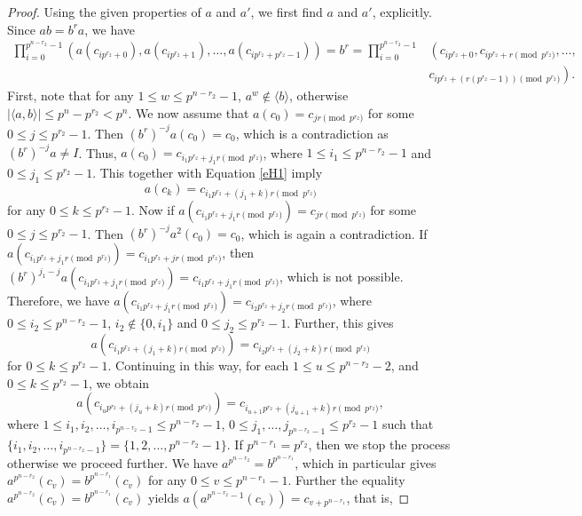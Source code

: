 \documentclass[11pt]{amsart}
\theoremstyle{plain}
\numberwithin{equation}{section}
\begin{document}
 \begin{proof}
 Using the given properties of $a$ and $a'$, we first find $a$ and $a'$, explicitly. Since $ab=b^{r}a$, we have 
 \begin{equation}\label{eH1}
 \begin{split}
 \displaystyle  \prod_{i=0}^{p^{n-r_2}-1}\left(a(c_{ip^{r_2}+0}),a(c_{ip^{r_2}+1}),\ldots,a(c_{ip^{r_2}+p^{r_2}-1})\right)=b^r=\displaystyle  \prod_{i=0}^{p^{n-r_2}-1}&\left(c_{ip^{r_2}+0},c_{ip^{r_2}+r\pmod{p^{r_2}}},\ldots,\right.\\&\left. c_{ip^{r_2}+(r(p^{r_2}-1))\pmod{p^{r_2}}}\right).
 \end{split}
 \end{equation}
 First, note that for any $1 \le w \le p^{n-r_2}-1$, $a^w \not \in \langle b \rangle$, otherwise $|\langle a,b \rangle| \leq p^n-p^{r_2}  <p^n$.  We now assume that $a(c_0)=c_{jr \pmod{p^{r_2}}}$ for some $0 \le j \le p^{r_2}-1$. Then $(b^r)^{-j}a(c_0)=c_0$, which is a contradiction as $(b^r)^{-j}a \neq I$. Thus, $a(c_0)=c_{i_1p^{r_2}+j_1r \pmod{p^{r_2}}}$, where $1 \le i_1 \le p^{n-r_2}-1$ and $0 \le j_1 \le p^{r_2}-1$. This together with Equation \eqref{eH1} imply 
 \begin{equation}\label{eH2}
 a(c_k)=c_{i_1p^{r_2}+(j_1+k)r\pmod{p^{r_2}}}
 \end{equation}
  for any $0 \leq k \leq p^{r_2}-1$. Now if $a(c_{i_1p^{r_2}+j_1r \pmod{p^{r_2}}})=c_{jr \pmod{p^{r_2}}}$ for some $0 \le j \le p^{r_2}-1$. Then $(b^r)^{-j}a^2(c_0)=c_0$, which is again a contradiction. If  $a(c_{i_1p^{r_2}+j_1r \pmod{p^{r_2}}})=c_{i_1p^{r_2}+jr \pmod{p^{r_2}}}$, then $(b^r)^{j_1-j}a(c_{i_1p^{r_2}+j_1r \pmod{p^{r_2}}})=c_{i_1p^{r_2}+j_1r \pmod{p^{r_2}}}$, which is not possible. Therefore, we have $a(c_{i_1p^{r_2}+j_1r \pmod{p^{r_2}}})=c_{i_2p^{r_2}+j_2r \pmod{p^{r_2}}}$, where $0 \le i_2 \le p^{n-r_2}-1$, $i_2 \not \in \{0,i_1\}$ and $0 \le j_2 \le p^{r_2}-1$. Further, this gives $$a\left(c_{i_1p^{r_2}+(j_1+k)r \pmod{p^{r_2}}}\right)=c_{i_2p^{r_2}+(j_2+k)r \pmod{p^{r_2}}}$$ for $ 0 \le k \le p^{r_2}-1$. Continuing in this way, for each $1 \le u \le p^{n-r_2}-2$, and $0 \le k \le p^{r_2}-1$, we obtain 
 \begin{equation}\label{eH3}
 a\left(c_{i_up^{r_2}+(j_u+k)r \pmod{p^{r_2}}}\right)=c_{i_{u+1}p^{r_2}+(j_{u+1}+k)r \pmod{p^{r_2}}},
 \end{equation}
 where $1 \leq i_1,i_2,\ldots,i_{p^{n-r_2}-1} \leq p^{n-r_2}-1$, $0 \le j_1,\ldots,j_{p^{n-r_2}-1} \le p^{r_2}-1$ such that $\{i_1,i_2,\ldots,i_{p^{n-r_2}-1}\}=\{1,2,\ldots,p^{n-r_2}-1\}$. If $p^{n-r_1}=p^{r_2}$, then we stop the process otherwise we proceed further. We have $a^{p^{n-r_2}}=b^{p^{n-r_1}}$, which in particular gives $a^{p^{n-r_2}}(c_{v})=b^{p^{n-r_1}}(c_v)$ for any $0 \le v \le p^{n-r_1}-1$. Further the equality $a^{p^{n-r_2}}(c_{v})=b^{p^{n-r_1}}(c_v)$ yields $a(a^{p^{n-r_2}-1}(c_{v}))=c_{v+p^{n-r_1}}$, that is, 

\end{proof}
\end{document}
